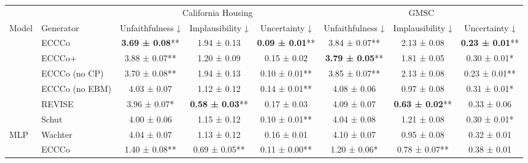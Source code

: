\documentclass[letterpaper]{article} %
\begin{document}
\begin{table}
  \setlength{\tabcolsep}{4pt}
  \centering
  \fontsize{9}{11}\selectfont
  \begin{tabular}[t]{llcccccc}
  \toprule
  \multicolumn{2}{c}{ } & \multicolumn{3}{c}{California Housing} & \multicolumn{3}{c}{GMSC} \\
  \cmidrule(l{3pt}r{3pt}){3-5} \cmidrule(l{3pt}r{3pt}){6-8}
  Model & Generator & Unfaithfulness ↓ & Implausibility ↓ & Uncertainty ↓ & Unfaithfulness ↓ & Implausibility ↓ & Uncertainty ↓\\
  \midrule
   & ECCCo & \textbf{3.69 ± 0.08}** & 1.94 ± 0.13\hphantom{*}\hphantom{*} & \textbf{0.09 ± 0.01}** & 3.84 ± 0.07** & 2.13 ± 0.08\hphantom{*}\hphantom{*} & \textbf{0.23 ± 0.01}**\\
  
   & ECCCo+ & 3.88 ± 0.07** & 1.20 ± 0.09\hphantom{*}\hphantom{*} & 0.15 ± 0.02\hphantom{*}\hphantom{*} & \textbf{3.79 ± 0.05}** & 1.81 ± 0.05\hphantom{*}\hphantom{*} & 0.30 ± 0.01*\hphantom{*}\\
  
   & ECCCo (no CP) & 3.70 ± 0.08** & 1.94 ± 0.13\hphantom{*}\hphantom{*} & 0.10 ± 0.01** & 3.85 ± 0.07** & 2.13 ± 0.08\hphantom{*}\hphantom{*} & 0.23 ± 0.01**\\
  
   & ECCCo (no EBM) & 4.03 ± 0.07\hphantom{*}\hphantom{*} & 1.12 ± 0.12\hphantom{*}\hphantom{*} & 0.14 ± 0.01** & 4.08 ± 0.06\hphantom{*}\hphantom{*} & 0.97 ± 0.08\hphantom{*}\hphantom{*} & 0.31 ± 0.01*\hphantom{*}\\
  
   & REVISE & 3.96 ± 0.07*\hphantom{*} & \textbf{0.58 ± 0.03}** & 0.17 ± 0.03\hphantom{*}\hphantom{*} & 4.09 ± 0.07\hphantom{*}\hphantom{*} & \textbf{0.63 ± 0.02}** & 0.33 ± 0.06\hphantom{*}\hphantom{*}\\
  
   & Schut & 4.00 ± 0.06\hphantom{*}\hphantom{*} & 1.15 ± 0.12\hphantom{*}\hphantom{*} & 0.10 ± 0.01** & 4.04 ± 0.08\hphantom{*}\hphantom{*} & 1.21 ± 0.08\hphantom{*}\hphantom{*} & 0.30 ± 0.01*\hphantom{*}\\
  
  \multirow{-7}{*}{\raggedright\arraybackslash MLP} & Wachter & 4.04 ± 0.07\hphantom{*}\hphantom{*} & 1.13 ± 0.12\hphantom{*}\hphantom{*} & 0.16 ± 0.01\hphantom{*}\hphantom{*} & 4.10 ± 0.07\hphantom{*}\hphantom{*} & 0.95 ± 0.08\hphantom{*}\hphantom{*} & 0.32 ± 0.01\hphantom{*}\hphantom{*}\\
  \cmidrule{1-8}
   & ECCCo & 1.40 ± 0.08** & 0.69 ± 0.05** & 0.11 ± 0.00** & 1.20 ± 0.06*\hphantom{*} & 0.78 ± 0.07** & 0.38 ± 0.01\hphantom{*}\hphantom{*}\\
  

\end{tabular}
\end{table}
\end{document}
